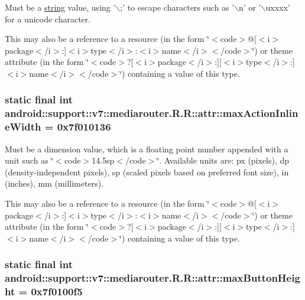 Must be a \hyperlink{classandroid_1_1support_1_1v7_1_1mediarouter_1_1_r_1_1string}{string} value, using '$\backslash$;' to escape characters such as '$\backslash$n' or '$\backslash$uxxxx' for a unicode character. 

This may also be a reference to a resource (in the form \char`\"{}$<$code$>$@\mbox{[}$<$i$>$package$<$/i$>$:\mbox{]}$<$i$>$type$<$/i$>$:$<$i$>$name$<$/i$>$$<$/code$>$\char`\"{}) or theme attribute (in the form \char`\"{}$<$code$>$?\mbox{[}$<$i$>$package$<$/i$>$:\mbox{]}\mbox{[}$<$i$>$type$<$/i$>$:\mbox{]}$<$i$>$name$<$/i$>$$<$/code$>$\char`\"{}) containing a value of this type. \hypertarget{classandroid_1_1support_1_1v7_1_1mediarouter_1_1_r_1_1attr_080ed760e3631b305c439704c1bbe20c}{
\subsubsection[{maxActionInlineWidth}]{\setlength{\rightskip}{0pt plus 5cm}static final int android::support::v7::mediarouter.R.R::attr::maxActionInlineWidth = 0x7f010136}}
\label{classandroid_1_1support_1_1v7_1_1mediarouter_1_1_r_1_1attr_080ed760e3631b305c439704c1bbe20c}


Must be a dimension value, which is a floating point number appended with a unit such as \char`\"{}$<$code$>$14.5sp$<$/code$>$\char`\"{}. Available units are: px (pixels), dp (density-independent pixels), sp (scaled pixels based on preferred font size), in (inches), mm (millimeters). 

This may also be a reference to a resource (in the form \char`\"{}$<$code$>$@\mbox{[}$<$i$>$package$<$/i$>$:\mbox{]}$<$i$>$type$<$/i$>$:$<$i$>$name$<$/i$>$$<$/code$>$\char`\"{}) or theme attribute (in the form \char`\"{}$<$code$>$?\mbox{[}$<$i$>$package$<$/i$>$:\mbox{]}\mbox{[}$<$i$>$type$<$/i$>$:\mbox{]}$<$i$>$name$<$/i$>$$<$/code$>$\char`\"{}) containing a value of this type. \hypertarget{classandroid_1_1support_1_1v7_1_1mediarouter_1_1_r_1_1attr_ee876b6164fb3f4650dae32be9083ca3}{
\subsubsection[{maxButtonHeight}]{\setlength{\rightskip}{0pt plus 5cm}static final int android::support::v7::mediarouter.R.R::attr::maxButtonHeight = 0x7f0100f5}}
\label{classandroid_1_1support_1_1v7_1_1mediarouter_1_1_r_1_1attr_ee876b6164fb3f4650dae32be9083ca3}


